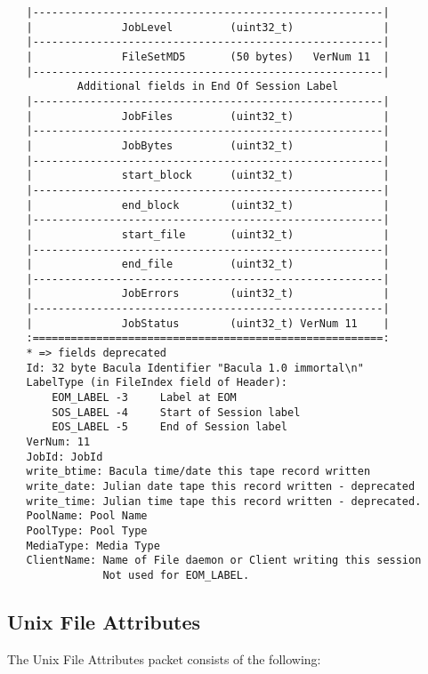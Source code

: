 \begin{verbatim}
   |-------------------------------------------------------|
   |              JobLevel         (uint32_t)              |
   |-------------------------------------------------------|
   |              FileSetMD5       (50 bytes)   VerNum 11  |
   |-------------------------------------------------------|
           Additional fields in End Of Session Label
   |-------------------------------------------------------|
   |              JobFiles         (uint32_t)              |
   |-------------------------------------------------------|
   |              JobBytes         (uint32_t)              |
   |-------------------------------------------------------|
   |              start_block      (uint32_t)              |
   |-------------------------------------------------------|
   |              end_block        (uint32_t)              |
   |-------------------------------------------------------|
   |              start_file       (uint32_t)              |
   |-------------------------------------------------------|
   |              end_file         (uint32_t)              |
   |-------------------------------------------------------|
   |              JobErrors        (uint32_t)              |
   |-------------------------------------------------------|
   |              JobStatus        (uint32_t) VerNum 11    |
   :=======================================================:
   * => fields deprecated
   Id: 32 byte Bacula Identifier "Bacula 1.0 immortal\n"
   LabelType (in FileIndex field of Header):
       EOM_LABEL -3     Label at EOM
       SOS_LABEL -4     Start of Session label
       EOS_LABEL -5     End of Session label
   VerNum: 11
   JobId: JobId
   write_btime: Bacula time/date this tape record written
   write_date: Julian date tape this record written - deprecated
   write_time: Julian time tape this record written - deprecated.
   PoolName: Pool Name
   PoolType: Pool Type
   MediaType: Media Type
   ClientName: Name of File daemon or Client writing this session
               Not used for EOM_LABEL.
\end{verbatim}
\normalsize

\subsection*{Unix File Attributes}

The Unix File Attributes packet consists of the following: 

